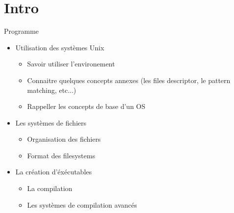 

%
%
%

\part{Intro}

\begin{frame}[fragile=singleslide]{Programme}
  \begin{itemize} 
  \item Utilisation des systèmes Unix
    \begin{itemize}
    \item Savoir utiliser l'environement
    \item Connaitre  quelques concepts annexes  (les files descriptor,
      le pattern matching, etc...)
    \item Rappeller les concepts de base d'un OS
    \end{itemize}
  \item Les systèmes de fichiers
    \begin{itemize}
      \item Organisation des fichiers
      \item Format des filesystems
    \end{itemize}
  \item La création d'éxécutables
    \begin{itemize} 
    \item La compilation
    \item Les systèmes de compilation avancés
    \end{itemize} 
  \end{itemize}
\end{frame}
